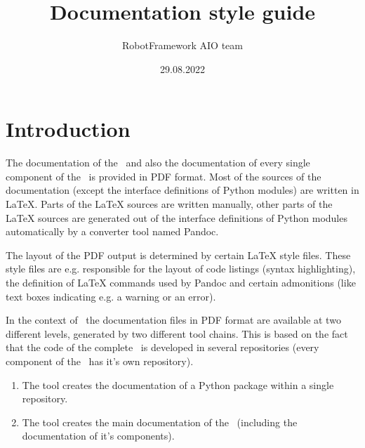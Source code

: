 \documentclass[a4paper,10pt]{report}
\author{RobotFramework AIO team}
\title{Documentation style guide}
\date{29.08.2022}
\begin{document}
\hypersetup{pageanchor=false}

\maketitle

\clearpage
{}
\tableofcontents

\clearpage
{}

\hypersetup{pageanchor=true}


\chapter{Introduction}

The documentation of the \rfw\ and also the documentation of every single component of the \rfw\ is provided in PDF format.
Most of the sources of the documentation (except the interface definitions of Python modules) are written in LaTeX.
Parts of the LaTeX sources are written manually, other parts of the LaTeX sources are generated out of the interface definitions of Python modules
automatically by a converter tool named Pandoc.

The layout of the PDF output is determined by certain LaTeX style files. These style files are e.g. responsible for the layout of code listings (syntax highlighting),
the definition of LaTeX commands used by Pandoc and certain admonitions (like text boxes indicating e.g. a warning or an error).

In the context of \rfw\ the documentation files in PDF format are available at two different levels, generated by two different tool chains. This is based on the
fact that the code of the complete \rfw\ is developed in several repositories (every component of the \rfw\ has it's own repository).

\begin{enumerate}

   \item The tool  creates the documentation of a Python package within a single repository.

   \item The tool  creates the main documentation of the \rfw\ (including the documentation of it's components).

\end{enumerate}
\end{document}
